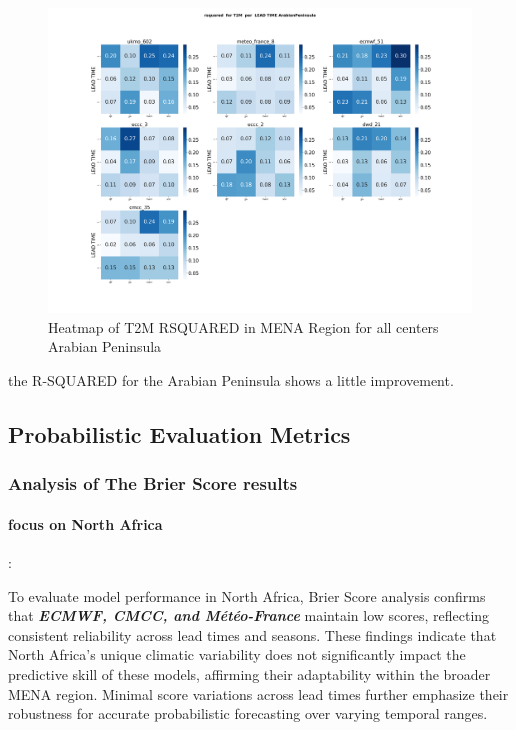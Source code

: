 \begin{figure}[H]
\includegraphics[scale=0.3]{plots/det/rsquared/rsquared_T2M_ArabianPeninsula.png}
\caption{Heatmap of T2M  RSQUARED in MENA Region for all centers Arabian Peninsula}
\end{figure}

the R-SQUARED for the Arabian Peninsula shows a little improvement.

\subsection{Probabilistic Evaluation Metrics}

\subsubsection{Analysis of The Brier Score results}

\paragraph{focus on North Africa}:

To evaluate model performance in North Africa, Brier Score analysis confirms that \textbf{\textit{ECMWF, CMCC, and Météo-France}} maintain low scores, reflecting consistent reliability across lead times and seasons. These findings indicate that North Africa’s unique climatic variability does not significantly impact the predictive skill of these models, affirming their adaptability within the broader MENA region. Minimal score variations across lead times further emphasize their robustness for accurate probabilistic forecasting over varying temporal ranges.

